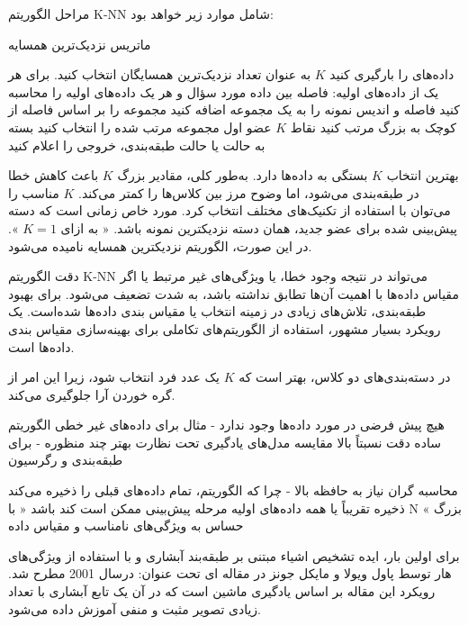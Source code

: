 مراحل الگوریتم K-NN شامل موارد زیر خواهد بود:


 ماتریس
 نزدیک‌ترین همسایه

 داده‌های را بارگیری کنید
 $K$ به عنوان تعداد نزدیک‌ترین همسایگان انتخاب کنید.
 برای هر یک از داده‌های اولیه:
 فاصله بین داده مورد سؤال و هر یک داده‌های اولیه را محاسبه کنید
 فاصله و اندیس نمونه را به یک مجموعه اضافه کنید
 مجموعه را بر اساس فاصله از کوچک به بزرگ مرتب کنید
 نقاط $K$ عضو اول مجموعه مرتب شده را انتخاب کنید
 بسته به حالت یا حالت طبقه‌بندی، خروجی را اعلام کنید


بهترین انتخاب $K$ بستگی به داده‌ها دارد. به‌طور کلی، مقادیر بزرگ $K$ باعث کاهش خطا در طبقه‌بندی می‌شود، اما وضوح مرز بین کلاس‌ها را کمتر می‌کند. $K$ مناسب را می‌توان با استفاده از تکنیک‌های مختلف انتخاب کرد. مورد خاص زمانی است که دسته پیش‌بینی شده برای عضو جدید، همان دسته نزدیکترین نمونه باشد. « به ازای $ K=1 $ ». در این صورت، الگوریتم نزدیکترین همسایه نامیده می‌شود.

دقت الگوریتم K-NN می‌تواند در نتیجه وجود خطا، یا ویژگی‌های غیر مرتبط یا اگر مقیاس داده‌ها با اهمیت آن‌ها تطابق نداشته باشد، به شدت تضعیف می‌شود. برای بهبود طبقه‌بندی، تلاش‌های زیادی در زمینه انتخاب یا مقیاس بندی داده‌ها شده‌است. یک رویکرد بسیار مشهور، استفاده از الگوریتم‌های تکاملی برای بهینه‌سازی مقیاس بندی داده‌ها است.

در دسته‌بندی‌های دو کلاس، بهتر است که $K$ یک عدد فرد انتخاب شود، زیرا این امر از گره خوردن آرا جلوگیری می‌کند.




 هیچ پیش فرضی در مورد داده‌ها وجود ندارد - مثال برای داده‌های غیر خطی
 الگوریتم ساده
 دقت نسبتاً بالا
 مقایسه مدل‌های یادگیری تحت نظارت بهتر
 چند منظوره - برای طبقه‌بندی و رگرسیون


 محاسبه گران
 نیاز به حافظه بالا - چرا که الگوریتم، تمام داده‌های قبلی را ذخیره می‌کند
 ذخیره تقریباً یا همه داده‌های اولیه
 مرحله پیش‌بینی ممکن است کند باشد « با N بزرگ »
 حساس به ویژگی‌های نامناسب و مقیاس داده




برای اولین بار، ایده تشخیص اشیاء مبتنی بر طبقه‌بند آبشاری و با استفاده از ویژگی‌های هار توسط پاول ویولا و مایکل جونز در مقاله ای تحت عنوان: 
 درسال 2001 مطرح شد. رویکرد این مقاله بر اساس یادگیری ماشین است که در آن یک تابع آبشاری با تعداد زیادی تصویر مثبت و منفی آموزش داده می‌شود. ~

